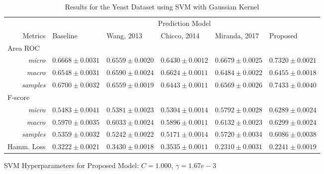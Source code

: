 \begin{table}[t]
    \footnotesize
    \centering
    \caption{Results for the Yeast Dataset using SVM with Gaussian Kernel}
    \label{results:yeast_svm}
    \begin{threeparttable}
    \begin{tabular}{@{}rrlllll@{}}
    \toprule
    && \multicolumn{5}{c}{Prediction Model} \\ \cmidrule{3-7}
    \multicolumn{2}{r}{Metrics}               & Baseline                & Wang, 2013 & Chicco, 2014 & Miranda, 2017 & Proposed            \\ \midrule
\multicolumn{2}{l}{Area ROC} \\
                    & \textit{micro}            & $0.6668 \pm 0.0031$ & $0.6559 \pm 0.0020$ & $0.6430 \pm 0.0012$ & $0.6679 \pm 0.0025$ & $\mathbf{0.7320 \pm 0.0021} $ \\
                     & \textit{macro}            & $0.6548 \pm 0.0031$ & $0.6590 \pm 0.0024$ & $\mathbf{0.6624 \pm 0.0011}$ & $0.6484 \pm 0.0022$ & $0.6455 \pm 0.0018 $ \\
                     & \textit{samples}            & $0.6700 \pm 0.0032$ & $0.6559 \pm 0.0019$ & $0.6443 \pm 0.0011$ & $0.6569 \pm 0.0026$ & $\mathbf{0.7433 \pm 0.0040} $ \\
\multicolumn{2}{l}{F-score} \\
                    & \textit{micro}            & $0.5483 \pm 0.0041$ & $0.5381 \pm 0.0023$ & $0.5304 \pm 0.0014$ & $0.5792 \pm 0.0028$ & $\mathbf{0.6289 \pm 0.0024} $ \\
                     & \textit{macro}            & $0.5970 \pm 0.0035$ & $0.6033 \pm 0.0024$ & $0.5896 \pm 0.0011$ & $0.6132 \pm 0.0023$ & $\mathbf{0.6299 \pm 0.0024} $ \\
                     & \textit{samples}            & $0.5359 \pm 0.0032$ & $0.5242 \pm 0.0022$ & $0.5171 \pm 0.0014$ & $0.5720 \pm 0.0034$ & $\mathbf{0.6086 \pm 0.0038} $ \\ 
\multicolumn{2}{l}{Hamm. Loss}            & $0.3222 \pm 0.0021$ & $0.3430 \pm 0.0018$ & $0.3535 \pm 0.0011$ & $0.2310 \pm 0.0031$ & $\mathbf{0.2241 \pm 0.0019}$ \\
\bottomrule
    \end{tabular}
    \begin{tablenotes}
        \item SVM Hyperparameters for Proposed Model: $C=1.000$, $\gamma=1.67e-3$
    \end{tablenotes}
    \end{threeparttable}
\end{table}
